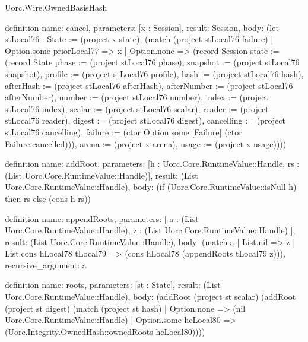 \begin{lexlean}{Uorc.Wire.OwnedBasisHash}
\begin{semanticmodule}
definition{
  name: cancel,
  parameters: [x : Session],
  result: Session,
  body: (let stLocal76 : State := (project x state); (match (project stLocal76 failure)
    | Option.some priorLocal77 => x
    | Option.none => (record Session {state := (record State {phase := (project stLocal76 phase), snapshot := (project stLocal76 snapshot), profile := (project stLocal76 profile), hash := (project stLocal76 hash), afterHash := (project stLocal76 afterHash), afterNumber := (project stLocal76 afterNumber), number := (project stLocal76 number), index := (project stLocal76 index), scalar := (project stLocal76 scalar), reader := (project stLocal76 reader), digest := (project stLocal76 digest), cancelling := (project stLocal76 cancelling), failure := (ctor Option.some [Failure] (ctor Failure.cancelled))}), arena := (project x arena), usage := (project x usage)})))
}

definition{
  name: addRoot,
  parameters: [h : Uorc.Core.RuntimeValue::Handle, rs : (List Uorc.Core.RuntimeValue::Handle)],
  result: (List Uorc.Core.RuntimeValue::Handle),
  body: (if (Uorc.Core.RuntimeValue::isNull h) then rs else (cons h rs))
}

definition{
  name: appendRoots,
  parameters: [
    a : (List Uorc.Core.RuntimeValue::Handle),
    z : (List Uorc.Core.RuntimeValue::Handle)
  ],
  result: (List Uorc.Core.RuntimeValue::Handle),
  body: (match a
    | List.nil => z
    | List.cons hLocal78 tLocal79 => (cons hLocal78 (appendRoots tLocal79 z))),
  recursive_argument: a
}

definition{
  name: roots,
  parameters: [st : State],
  result: (List Uorc.Core.RuntimeValue::Handle),
  body: (addRoot (project st scalar) (addRoot (project st digest) (match (project st hash)
    | Option.none => (nil Uorc.Core.RuntimeValue::Handle)
    | Option.some hcLocal80 => (Uorc.Integrity.OwnedHash::ownedRoots hcLocal80))))
}


\end{semanticmodule}
\end{lexlean}
